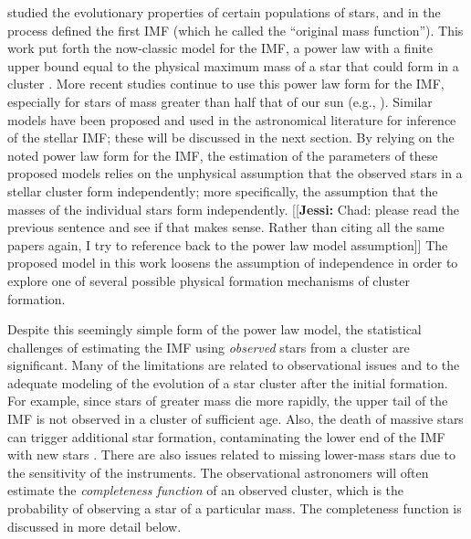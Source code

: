 \documentclass[12pt]{article}
\newcommand{\jessi}[1]{{\color{blue}[[\textbf{Jessi: }#1]]}}
\begin{document}
\cite{salpeter55} studied the evolutionary properties of certain 
populations of stars, and in the process defined the first IMF 
(which he called the ``original mass function'').  
This work put forth the now-classic model for the IMF, a power law 
with a finite upper bound equal to the physical maximum mass of a star that 
could form in a cluster \citep{salpeter55}.  
More recent studies continue to use this power law form for the IMF, especially for stars of mass greater than half that
of our sun (e.g., \citealt{Massey2003, bastian2010, DaRioEtAl2012, Lim2013, weisz13, Weisz:2015kx, Jose2017}).
Similar models have been proposed and used in the astronomical literature for inference of the 
stellar IMF; these will be discussed in the next section. 
By relying on the noted power law form for the IMF, the estimation of the parameters of these proposed models relies on the unphysical assumption that 
the observed stars in a stellar cluster form independently; more specifically, the assumption that the masses of the individual stars form independently. \jessi{Chad:  please read the previous sentence and see if that makes sense.  Rather than citing all the same papers again, I try to reference back to the power law model assumption}
The proposed model in this work loosens the assumption of independence in order to explore one of several possible physical formation 
mechanisms of cluster formation.

Despite this seemingly simple form of the power law model, the statistical challenges of estimating the 
IMF using \emph{observed} stars from a cluster are significant. Many of the limitations are related to 
observational issues and to the adequate modeling of the evolution of a star cluster after the 
initial formation. For example, since stars of greater mass die more rapidly, the upper tail of the IMF is 
not observed in a cluster of sufficient age.  
Also, the death of massive stars can trigger additional star formation,
contaminating the lower end of the IMF with new stars \citep{Woosley2015}.
There are also issues related to missing lower-mass stars due to the sensitivity of the instruments.  The observational astronomers will often estimate the \emph{completeness function} of an observed cluster, which is the probability of observing a star of a particular mass.  The completeness function is discussed in more detail below.
\end{document}
